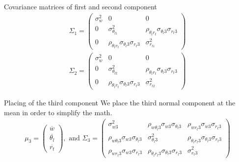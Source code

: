 \documentclass[10pt]{beamer}
\numberwithin{equation}{section}
\begin{document}
    \begin{frame}{Covariance matrices of first and second component}
        \begin{align}
            \Sigma_1 =
            \begin{pmatrix}
                \sigma_w^2 & 0                                                      & 0                                                      \\
                0          & \sigma_{\theta_{l1}}^2                                 & \rho_{\theta_l r_t} \sigma_{\theta_l 3} \sigma_{r_t 3} \\
                0          & \rho_{\theta_l r_t} \sigma_{\theta_l 3} \sigma_{r_t 3} & \sigma_{r_{t1}}^2
            \end{pmatrix}
        \end{align}
        \begin{align}
            \Sigma_2 =
            \begin{pmatrix}
                \sigma_w^2 & 0                                                      & 0                                                      \\
                0          & \sigma_{\theta_{l2}}^2                                 & \rho_{\theta_l r_t} \sigma_{\theta_l 3} \sigma_{r_t 3} \\
                0          & \rho_{\theta_l r_t} \sigma_{\theta_l 3} \sigma_{r_t 3} & \sigma_{r_{t2}}^2
            \end{pmatrix}
        \end{align}
    \end{frame}

    \begin{frame}{Placing of the third component}
        We place the third normal component at the mean in order to simplify the math.
        \begin{align}
            \mu_3 =
            \begin{pmatrix}
                \overline{w}        \\
                \overline{\theta_l} \\
                \overline{r_t}
            \end{pmatrix},
            \text{ and }
            \Sigma_3 =
            \begin{pmatrix}
                \sigma_{w 3}^2 &
                \rho_{w \theta_l 3} \sigma_{w 3} \sigma_{\theta_l 3} &
                \rho_{w r_t 3} \sigma_{w 3} \sigma_{r_t 3} \\
                \rho_{w \theta_l 3} \sigma_{w 3} \sigma_{\theta_l 3} &
                \sigma_{\theta_l 3}^2 &
                \rho_{\theta_l r_t 3} \sigma_{\theta_l 3} \sigma_{r_t 3} \\
                \rho_{w r_t 3} \sigma_{w 3} \sigma_{r_t 3} &
                \rho_{\theta_l r_t 3} \sigma_{\theta_l 3} \sigma_{r_t 3} &
                \sigma_{r_t 3}^2
            \end{pmatrix}
        \end{align}
    \end{frame}
\end{document}
